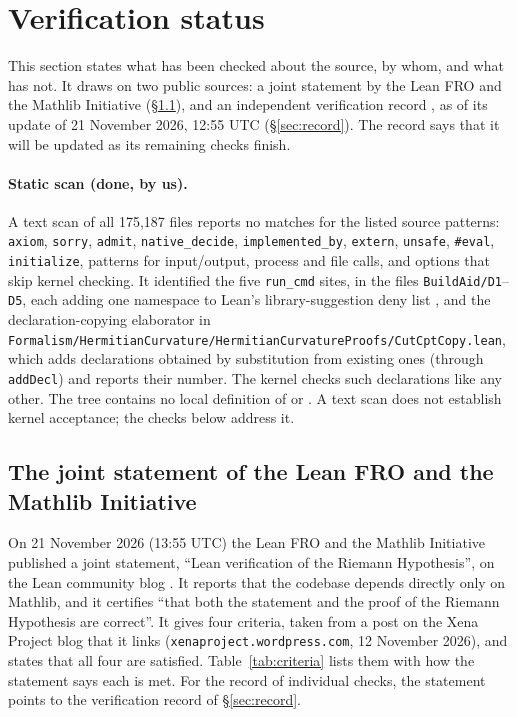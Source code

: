 \section{Verification status}\label{sec:verification}

This section states what has been checked about the source, by whom, and what has not. It draws on
two public sources: a joint statement by the Lean FRO and the Mathlib Initiative \cite{leanfro-mathlib}
(\S\ref{sec:joint}), and an independent verification record \cite{sutherland-1255}, as of its update of
21 November 2026, 12:55 UTC (\S\ref{sec:record}). The record says that it will be updated as its
remaining checks finish.

\paragraph{Static scan (done, by us).} A text scan of all 175{,}187 files reports no matches for the
listed source patterns: \texttt{axiom}, \texttt{sorry}, \texttt{admit}, \texttt{native\_decide},
\texttt{implemented\_by}, \texttt{extern}, \texttt{unsafe}, \texttt{\#eval}, \texttt{initialize},
patterns for input/output, process and file calls, and options that skip kernel checking. It
identified the five \texttt{run\_cmd} sites, in the files \texttt{BuildAid/D1}--\texttt{D5}, each
adding one namespace to Lean's library-suggestion deny list , and the
declaration-copying elaborator in
\texttt{Formalism/HermitianCurvature/HermitianCurvatureProofs/CutCptCopy.lean}, which adds
declarations obtained by substitution from existing ones (through \texttt{addDecl}) and reports
their number. The kernel checks such declarations like any other. The tree contains no local
definition of  or . A text scan does not establish
kernel acceptance; the checks below address it.

\subsection{The joint statement of the Lean FRO and the Mathlib Initiative}\label{sec:joint}

On 21 November 2026 (13:55 UTC) the Lean FRO and the Mathlib Initiative published a joint statement,
``Lean verification of the Riemann Hypothesis'', on the Lean community blog \cite{leanfro-mathlib}.
It reports that the codebase depends directly only on Mathlib, and it certifies ``that both the
statement and the proof of the Riemann Hypothesis are correct''. It gives four criteria, taken from
a post on the Xena Project blog that it links (\nolinkurl{xenaproject.wordpress.com}, 12 November
2026), and states that all four are satisfied. Table~\ref{tab:criteria} lists them with how the
statement says each is met. For the record of individual checks, the statement points to the
verification record of \S\ref{sec:record}.

